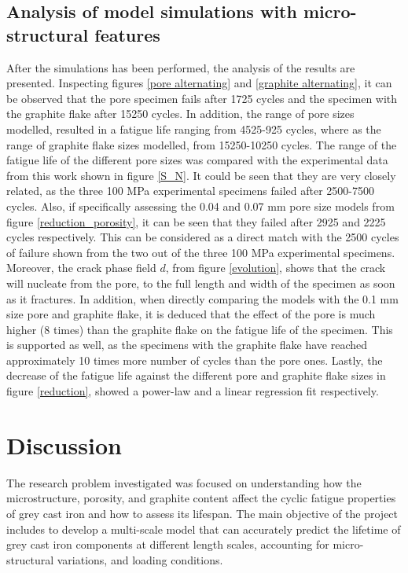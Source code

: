 \documentclass[11pt,a4paper]{article}
\begin{document}
\subsection{Analysis of model simulations with micro-structural features}
\label{analysis of features}
After the simulations has been performed, the analysis of the results are presented. Inspecting figures \ref{pore alternating} and \ref{graphite alternating}, it can be observed that the pore specimen fails after 1725 cycles and the specimen with the graphite flake after 15250 cycles. In addition, the range of pore sizes modelled, resulted in a fatigue life ranging from 4525-925 cycles, where as the range of graphite flake sizes modelled, from 15250-10250 cycles. The range of the fatigue life of the different pore sizes was compared with the experimental data from this work shown in figure \ref{S_N}. It could be seen that they are very closely related, as the three 100 MPa experimental specimens failed after 2500-7500 cycles. Also, if specifically assessing the 0.04 and 0.07 mm pore size models from figure \ref{reduction_porosity}, it can be seen that they failed after 2925 and 2225 cycles respectively. This can be considered as a direct match with the 2500 cycles of failure shown from the two out of the three 100 MPa experimental specimens. Moreover, the crack phase field $d$, from figure \ref{evolution}, shows that the crack will nucleate from the pore, to the full length and width of the specimen as soon as it fractures. In addition, when directly comparing the models with the 0.1 mm size pore and graphite flake, it is deduced that the effect of the pore is much higher (8 times) than the graphite flake on the fatigue life of the specimen. This is supported as well, as the specimens with the graphite flake have reached approximately 10 times more number of cycles than the pore ones. Lastly, the decrease of the fatigue life against the different pore and graphite flake sizes in figure \ref{reduction}, showed a power-law and a linear regression fit respectively. 

\section{Discussion}
The research problem investigated was focused on understanding how the microstructure, porosity, and graphite content affect the cyclic fatigue properties of grey cast iron and how to assess its lifespan. The main objective of the project includes to develop a multi-scale model that can accurately predict the lifetime of grey cast iron components at different length scales, accounting for micro-structural variations, and loading conditions.
\end{document}

